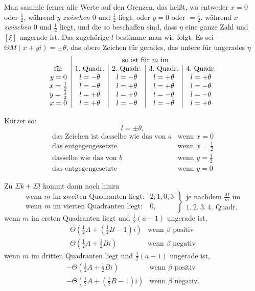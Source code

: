 Man sammle ferner alle Werte auf den Grenzen, das heißt, wo entweder $x=0$ oder $\frac12$, während $y$ \emph{zwischen} $0$ und $\frac12$ liegt, oder $y=0$ oder $=\frac12$, während $x$ \emph{zwischen} $0$ und $\frac12$ liegt, und die so beschaffen sind, dass $\eta$ eine ganze Zahl und $[\xi]$ ungerade ist. Das zugehörige $l$ bestimme man wie folgt. Es sei $\Theta M(x+yi)=\pm\theta$, das obere Zeichen für gerades, das untere für ungerades $\eta$
\[
\begin{array}{c|c|c|c|c}
&\multicolumn{4}{c}{\text{so ist für }m\text{ im}}\\
\text{für}&1.\text{ Quadr.}&2.\text{ Quadr.}&3.\text{ Quadr.}&4.\text{ Quadr.}\\
y=0&l=-\theta&l=-\theta&l=+\theta&l=+\theta\\
x=\frac12&l=-\theta&l=+\theta&l=+\theta&l=-\theta\\
y=\frac12&l=+\theta&l=+\theta&l=-\theta&l=-\theta\\
x=0&l=+\theta&l=-\theta&l=-\theta&l=+\theta
\end{array}
\]

Kürzer so:
\[
l=\pm\theta,
\]
\[
\begin{array}{ll}
\text{das Zeichen ist dasselbe wie das von }a&\text{wenn }x=0\\
\text{das entgegengesetzte}&\text{wenn }x=\frac12\\
\text{dasselbe wie das von }b&\text{wenn }y=\frac12\\
\text{das entgegengesetzte}&\text{wenn }y=0
\end{array}
\]

Zu $\Sigma k+\Sigma l$ kommt dann noch hinzu
\[
\left.\begin{array}{ll}
\text{wenn }m\text{ im zweiten Quadranten liegt:}&2,1,0,3\\
\text{wenn }m\text{ im vierten Quadranten liegt:}&0,
\end{array}\right\}
\begin{array}{l}\text{je nachdem }\frac{M}{m}\text{ im}\\1.\ 2.\ 3.\ 4.\text{ Quadr.}\end{array}
\]
wenn $m$ im ersten Quadranten liegt und $\frac12(a-1)$ ungerade ist,
\[
\begin{array}{ll}
\Theta(\frac12A+(\frac12B-1)i)&\text{wenn }\beta\text{ positiv}\\
\Theta(\frac12A+\frac12Bi)&\text{wenn }\beta\text{ negativ}
\end{array}
\]
wenn $m$ im dritten Quadranten liegt und $\frac12(a-1)$ ungerade ist,
\[
\begin{array}{ll}
-\Theta(\frac12A+\frac12Bi)&\text{wenn }\beta\text{ positiv}\\
-\Theta(\frac12A+(\frac12B-1)i)&\text{wenn }\beta\text{ negativ.}
\end{array}
\]
